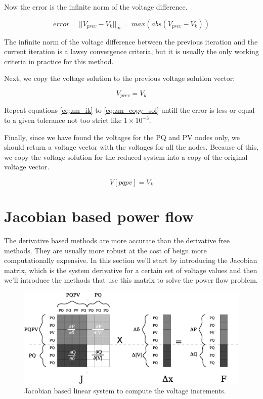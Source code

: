 \documentclass{tufte-book}
\begin{document}
Now the error is the infinite norm of the voltage difference.

\begin{equation}
error = ||V_{prev} - V_k ||_{\infty} = max(abs(V_{prev} - V_k ))
\end{equation}

The infinite norm of the voltage difference between the previous iteration and the current iteration is a lawsy convergence criteria, but it is usually the only working criteria in practice for this method.

Next, we copy the voltage solution to the previous voltage solution vector:

\begin{equation}
V_{prev} = V_k
\label{eq:zm_copy_sol}
\end{equation}

Repeat equations \ref{eq:zm_ik} to \ref{eq:zm_copy_sol} untill the error is less or equal to a given tolerance not too strict like $1\times10^{-3}$.

Finally, since we have found the voltages for the PQ and PV nodes only, we should return a voltage vector with the voltages for all the nodes. Because of this, we copy the voltage solution for the reduced system into a copy of the original voltage vector.

\begin{equation}
V[pqpv] = V_k
\end{equation}


\section{Jacobian based power flow}

The derivative based methods are more accurate than the derivative free methods. They are usually more robust at the cost of beign more computationally expensive. In this section we'll start by introducing the Jacobian matrix, which is the system derivative for a certain set of voltage values and then we'll introduce the methods that use this matrix to solve the power flow problem.

\begin{center}
\begin{figure}[h!]
  \includegraphics[width=0.9\linewidth]{img/JacobianBased.eps}
  \caption{Jacobian based linear system to compute the voltage increments.}
  \label{fig:jacobian_based}
\end{figure}
\end{center}
\end{document}
